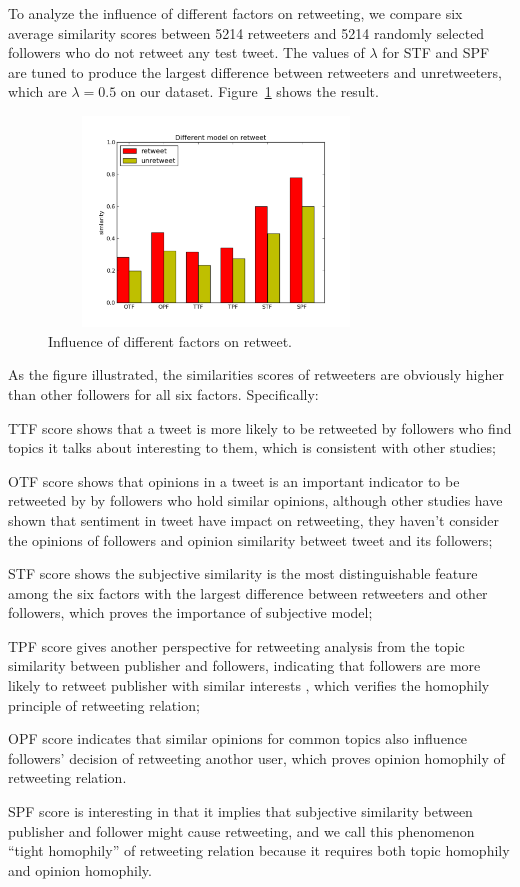 \documentclass{acm_proc_article-sp}
\begin{document}
To analyze the influence of different factors on retweeting, we compare six average similarity scores between 5214 retweeters and 5214 randomly selected followers who do not retweet any test tweet. The values of $ \lambda $ for STF and SPF are tuned to produce the largest difference between retweeters and unretweeters, which are $ \lambda =0.5 $ on our dataset. Figure~\ref{fig:graph6} shows the result.
\begin{figure}[htb]
\centering
\includegraphics[width=3.5in,height=2.2in]{component.pdf}
\caption{Influence of different factors on retweet.}
\label{fig:graph6}
\end{figure}
As the figure illustrated, the similarities scores of retweeters are obviously higher than other followers for all six factors. Specifically: 
\begin{itemize*}
\item TTF score shows that a tweet is more likely to be retweeted by followers who find topics it talks about interesting to them, which is consistent with other studies\cite{conf/icwsm/MacskassyM11, conf/wsdm/FengW13};
\item OTF score shows that opinions in a tweet is an important indicator to be retweeted by by followers who hold similar opinions, although other studies\cite{conf/icwsm/PfitznerGS12,2011:NaveedGKC} have shown that sentiment in tweet have impact on retweeting, they haven't consider the opinions of followers and opinion similarity betweet tweet and its followers;
\item STF score shows the subjective similarity is the most distinguishable feature among the six factors with the largest difference between retweeters and other followers, which proves the importance of subjective model;
\item TPF score gives another perspective for retweeting analysis from the topic similarity between publisher and followers, indicating that followers are more likely to retweet publisher with similar interests , which verifies the homophily principle of retweeting relation;
\item OPF score indicates that similar opinions for common topics also influence followers' decision of retweeting anothor user, which proves opinion homophily of retweeting relation.
\item SPF score is interesting in that it implies that subjective similarity between publisher and follower might cause retweeting, and we call this phenomenon ``tight homophily'' of retweeting relation because it requires both topic homophily and opinion homophily.
\end{itemize*} 
\end{document}
